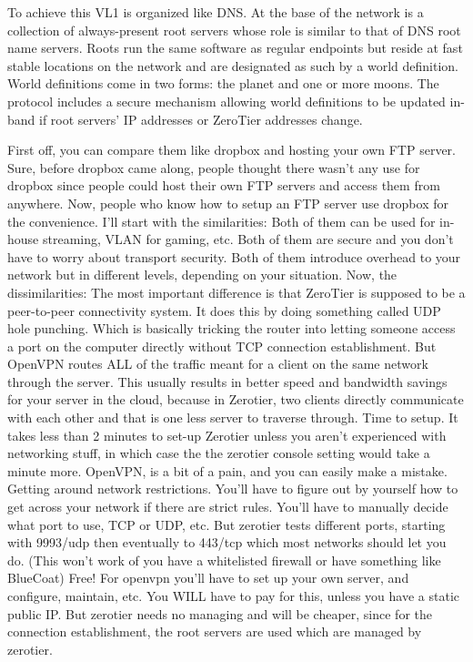 To achieve this VL1 is organized like DNS. At the base of the network is a collection of always-present root servers whose role is similar to that of DNS root name servers. Roots run the same software as regular endpoints but reside at fast stable locations on the network and are designated as such by a world definition. World definitions come in two forms: the planet and one or more moons. The protocol includes a secure mechanism allowing world definitions to be updated in-band if root servers’ IP addresses or ZeroTier addresses change.


First off, you can compare them like dropbox and hosting your own FTP server. Sure, before dropbox came along, people thought there wasn't any use for dropbox since people could host their own FTP servers and access them from anywhere. Now, people who know how to setup an FTP server use dropbox for the convenience.
I'll start with the similarities:
Both of them can be used for in-house streaming, VLAN for gaming, etc.
Both of them are secure and you don't have to worry about transport security.
Both of them introduce overhead to your network but in different levels, depending on your situation.
Now, the dissimilarities:
The most important difference is that ZeroTier is supposed to be a peer-to-peer connectivity system. It does this by doing something called UDP hole punching. Which is basically tricking the router into letting someone access a port on the computer directly without TCP connection establishment. But OpenVPN routes ALL of the traffic meant for a client on the same network through the server. This usually results in better speed and bandwidth savings for your server in the cloud, because in Zerotier, two clients directly communicate with each other and that is one less server to traverse through.
Time to setup. It takes less than 2 minutes to set-up Zerotier unless you aren't experienced with networking stuff, in which case the the zerotier console setting would take a minute more. OpenVPN, is a bit of a pain, and you can easily make a mistake.
Getting around network restrictions. You'll have to figure out by yourself how to get across your network if there are strict rules. You'll have to manually decide what port to use, TCP or UDP, etc. But zerotier tests different ports, starting with 9993/udp then eventually to 443/tcp which most networks should let you do. (This won't work of you have a whitelisted firewall or have something like BlueCoat)
Free! For openvpn you'll have to set up your own server, and configure, maintain, etc. You WILL have to pay for this, unless you have a static public IP. But zerotier needs no managing and will be cheaper, since for the connection establishment, the root servers are used which are managed by zerotier.
